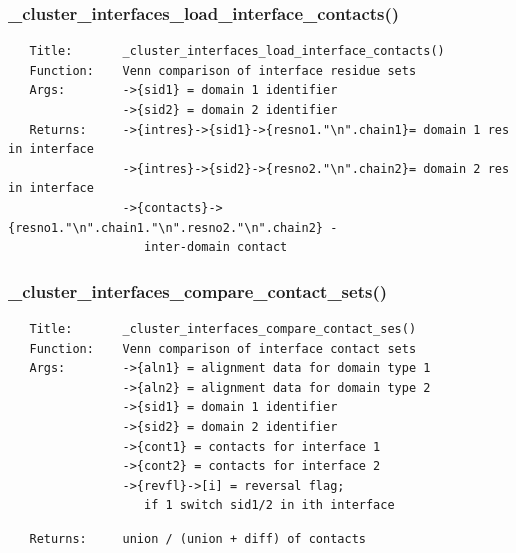 \documentclass{article}
\begin{document}
\subsubsection*{\_cluster\_interfaces\_load\_interface\_contacts()\label{pibase::calc::interfaces__cluster_interfaces_load_interface_contacts_}}
\begin{verbatim}
   Title:       _cluster_interfaces_load_interface_contacts()
   Function:    Venn comparison of interface residue sets 
   Args:        ->{sid1} = domain 1 identifier
                ->{sid2} = domain 2 identifier
   Returns:     ->{intres}->{sid1}->{resno1."\n".chain1}= domain 1 res in interface
                ->{intres}->{sid2}->{resno2."\n".chain2}= domain 2 res in interface
                ->{contacts}->{resno1."\n".chain1."\n".resno2."\n".chain2} -
                   inter-domain contact
\end{verbatim}
\subsubsection*{\_cluster\_interfaces\_compare\_contact\_sets()\label{pibase::calc::interfaces__cluster_interfaces_compare_contact_sets_}}
\begin{verbatim}
   Title:       _cluster_interfaces_compare_contact_ses()
   Function:    Venn comparison of interface contact sets 
   Args:        ->{aln1} = alignment data for domain type 1
                ->{aln2} = alignment data for domain type 2
                ->{sid1} = domain 1 identifier
                ->{sid2} = domain 2 identifier
                ->{cont1} = contacts for interface 1
                ->{cont2} = contacts for interface 2
                ->{revfl}->[i] = reversal flag;
                   if 1 switch sid1/2 in ith interface
\end{verbatim}
\begin{verbatim}
   Returns:     union / (union + diff) of contacts
\end{verbatim}
\end{document}

